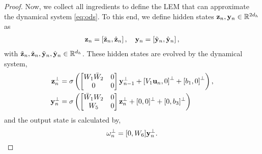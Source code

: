 \documentclass{article} \usepackage{iclr2022_conference,times}
\newcommand{\by}{{\bf y}}
\newcommand{\bz}{{\bf z}}
\newcommand{\bu}{{\bf u}}
\newcommand{\R}{{\mathbb R}}
\newcommand{\bom}{{\bf \omega}}
\begin{document}
\begin{proof}
Now, we collect all ingredients to define the LEM that can approximate the dynamical system \eqref{eq:ods}. To this end, we define hidden states $\bz_n,\by_n \in \R^{2d_h}$ as 
\begin{align*}
    \bz_n = \left[\tilde{\bz}_n,\hat{\bz}_n\right], \quad  \by_n = \left[\tilde{\by}_n,\hat{\by}_n\right],
\end{align*}
with $\tilde{\bz}_n,\hat{\bz}_n,\tilde{\by}_n,\hat{\by}_n \in \R^{d_h}$. These hidden states are evolved by the dynamical system,
\begin{equation}
    \label{eq:exp116}
    \begin{aligned}
    \bz_n^{\perp} &= \sigma \left( \begin{bmatrix}
    W_1\bar{W}_2 & 0 \\
    0 & 0
    \end{bmatrix} 
    \by_{n-1}^{\perp} + \left[V_1\bu_n,  0\right]^{\perp}  + \left[b_1, 0 \right]^{\perp} \right), \\
 \by_n^{\perp} &= \sigma \left( \begin{bmatrix}
    \bar{W}_1 W_2 & 0 \\
    W_5 & 0  
    \end{bmatrix} 
    \bz_{n}^{\perp} + [0,0]^{\perp} + [0,b_3]^{\perp}\right)
    \end{aligned}
\end{equation}
and the output state is calculated by, 
\begin{equation}
    \label{eq:exp117}
    \bom_n^{\perp} = [0, W_6]\by_n^{\perp} .
\end{equation}


\end{proof}
\end{document}
